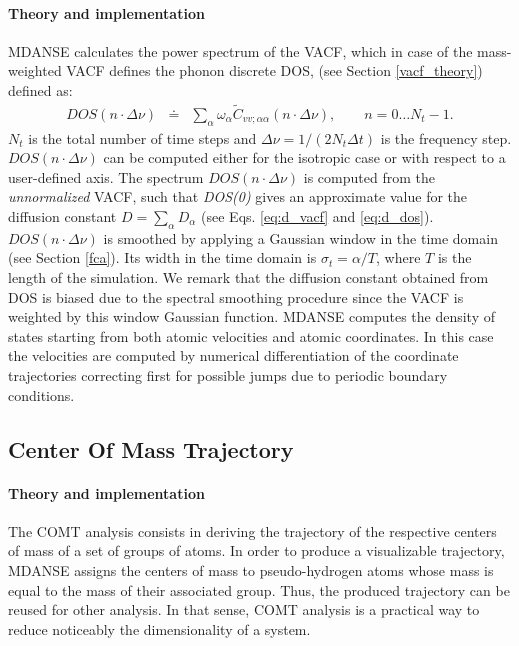 \documentclass[a4paper,11pt]{article}
\begin{document}
\paragraph{Theory and implementation\\}
\label{dos_theory}
\gls{MDANSE} calculates the power spectrum of the \gls{VACF}, which in case of the mass-weighted \gls{VACF} defines the phonon
discrete \gls{DOS}, (see Section \ref{vacf_theory}) defined as:
\begin{eqnarray}
DOS(n\cdot\Delta \nu)  &\doteq &\sum\limits_{\alpha} \omega_\alpha
\tilde C_{vv ; \alpha\alpha}(n\cdot\Delta \nu),\qquad n = 0\ldots N_t - 1.
\end{eqnarray}
$N_t$ is the total number of time steps and $\Delta\nu = 1/(2N_t \Delta t)$ is the frequency step. $DOS(n\cdot\Delta\nu)$ can
be computed either for the isotropic case or with respect to a user-defined axis. The spectrum $DOS(n\cdot\Delta \nu)$ is computed from the
\textit{unnormalized} \gls{VACF}, such that \textit{DOS(0)} gives an approximate value for the diffusion constant
$D = \sum\limits_\alpha D_\alpha$ (see Eqs. \ref{eq:d_vacf} and \ref{eq:d_dos}). $DOS(n\cdot\Delta \nu)$ is smoothed by
applying a Gaussian window in the time domain \cite{Harris} (see Section \ref{fca}). Its width in the time domain is
$\sigma_t=\alpha/T$, where $T$ is the length of
the simulation. We remark that the diffusion constant obtained from \gls{DOS} is biased due to the spectral smoothing procedure since
the \gls{VACF} is weighted by this window Gaussian function. \gls{MDANSE} computes the density of states starting from both atomic velocities
and atomic coordinates. In this case the velocities are computed by numerical differentiation of the coordinate trajectories correcting
first for possible jumps due to periodic boundary conditions.

\subsection{Center Of Mass Trajectory}
\label{comt}
\paragraph{Theory and implementation\\}
\label{comt_theory}
The \gls{COMT} analysis consists in deriving the trajectory of the respective centers of mass of a
set of groups of atoms. In order to produce a visualizable trajectory, \gls{MDANSE} assigns the centers of mass to
pseudo-hydrogen atoms whose mass is equal to the mass of their associated group. Thus, the produced trajectory can be reused
for other analysis. In that sense, \gls{COMT} analysis is a practical way to reduce noticeably the dimensionality of a system.
\end{document}
